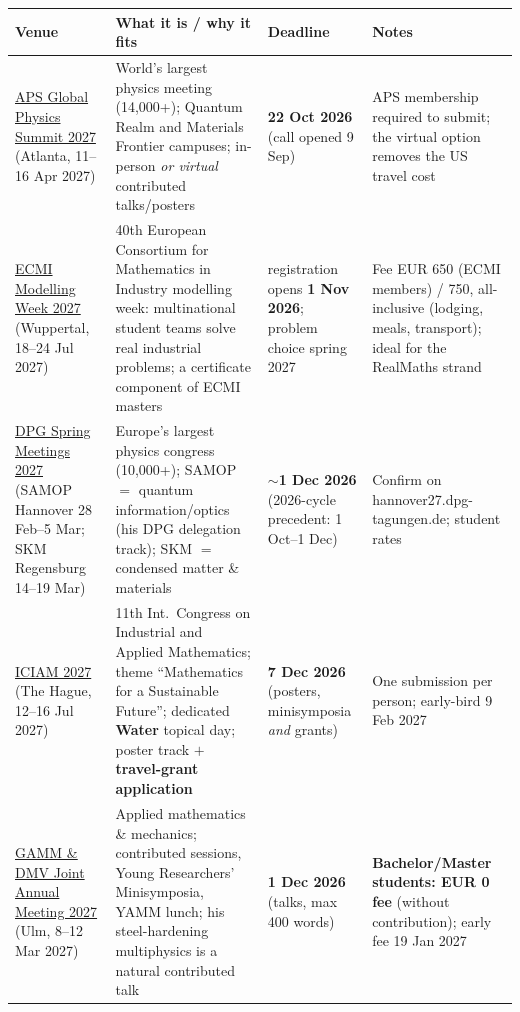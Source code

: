 \documentclass[11pt,a4paper]{article}
\begin{document}
\begin{longtable}{@{}p{3.3cm}p{5.6cm}p{2.2cm}p{2.8cm}@{}}
\toprule
\textbf{Venue} & \textbf{What it is / why it fits} & \textbf{Deadline} & \textbf{Notes} \\
\midrule
\endhead
\href{https://summit.aps.org/attend/abstracts}{APS Global Physics Summit 2027} (Atlanta, 11--16 Apr 2027) & World's largest physics meeting (14{,}000+); Quantum Realm and Materials Frontier campuses; in-person \emph{or virtual} contributed talks/posters & \textbf{22 Oct 2026} (call opened 9 Sep) & APS membership required to submit; the virtual option removes the US travel cost \\
\midrule
\href{https://ecmimw.uni-wuppertal.de/en}{ECMI Modelling Week 2027} (Wuppertal, 18--24 Jul 2027) & 40th European Consortium for Mathematics in Industry modelling week: multinational student teams solve real industrial problems; a certificate component of ECMI masters & registration opens \textbf{1 Nov 2026}; problem choice spring 2027 & Fee EUR 650 (ECMI members) / 750, all-inclusive (lodging, meals, transport); ideal for the RealMaths strand \\
\midrule
\href{https://www.dpg-physik.de/aktivitaeten-und-programme/tagungen/fruehjahrstagungen/2027}{DPG Spring Meetings 2027} (SAMOP Hannover 28 Feb--5 Mar; SKM Regensburg 14--19 Mar) & Europe's largest physics congress (10{,}000+); SAMOP $=$ quantum information/optics (his DPG delegation track); SKM $=$ condensed matter \& materials & $\sim$\textbf{1 Dec 2026} (2026-cycle precedent: 1 Oct--1 Dec) & Confirm on hannover27.dpg-tagungen.de; student rates \\
\midrule
\href{https://iciam2027.org/}{ICIAM 2027} (The Hague, 12--16 Jul 2027) & 11th Int.\ Congress on Industrial and Applied Mathematics; theme ``Mathematics for a Sustainable Future''; dedicated \textbf{Water} topical day; poster track $+$ \textbf{travel-grant application} & \textbf{7 Dec 2026} (posters, minisymposia \emph{and} grants) & One submission per person; early-bird 9 Feb 2027 \\
\midrule
\href{https://jahrestagung.gamm.org/joint-annual-meeting-2027/}{GAMM \& DMV Joint Annual Meeting 2027} (Ulm, 8--12 Mar 2027) & Applied mathematics \& mechanics; contributed sessions, Young Researchers' Minisymposia, YAMM lunch; his steel-hardening multiphysics is a natural contributed talk & \textbf{1 Dec 2026} (talks, max 400 words) & \textbf{Bachelor/Master students: EUR 0 fee} (without contribution); early fee 19 Jan 2027 \\
\midrule

\end{longtable}
\end{document}
